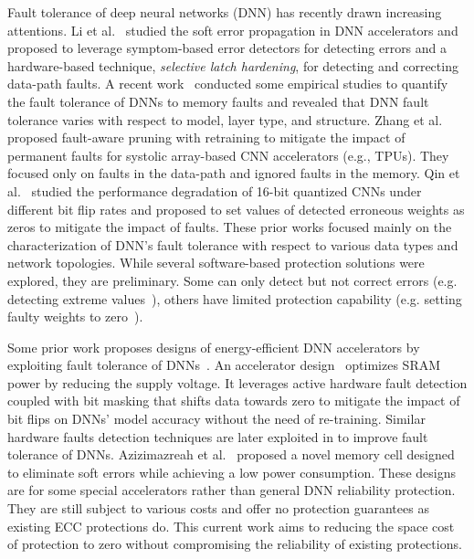 \documentclass{article}
\begin{document}
Fault tolerance of deep neural networks (DNN) has recently drawn increasing attentions. 
Li et al.~\cite{li2017understanding} studied the soft error propagation in DNN accelerators and proposed to leverage symptom-based error detectors for detecting errors and a hardware-based technique, {\em selective latch hardening},  for detecting and correcting data-path faults. A recent work~\cite{reagen2018ares, arechiga2018the} conducted some empirical studies to quantify the fault tolerance of DNNs to memory faults and revealed that DNN fault tolerance varies with respect to model, layer type, and structure. Zhang et al.~\cite{zhang2018analyzing} proposed fault-aware pruning with retraining to mitigate the impact of permanent faults for systolic array-based CNN accelerators (e.g., TPUs). They focused only on faults in the data-path and ignored faults in the memory.
Qin et al.~\cite{qin2017robustness} studied the performance degradation of 16-bit quantized CNNs under different bit flip rates and proposed to set values of detected erroneous weights as zeros to mitigate the impact of faults. 
These prior works focused mainly on the characterization of DNN's fault tolerance with respect to various data types and network topologies. While several software-based protection solutions were explored, they are preliminary. Some can only detect but not correct errors (e.g. detecting extreme values~\cite{li2017understanding}), others have limited protection capability (e.g. setting faulty weights to zero~\cite{qin2017robustness}).

Some prior work proposes designs of energy-efficient DNN accelerators by exploiting fault tolerance of DNNs~\cite{temam2012defect, kim2018energy, zhang2018thundervolt}. An accelerator design~\cite{reagen2016minerva} optimizes SRAM power by reducing the supply voltage. It leverages active hardware fault detection coupled with bit masking that shifts data towards zero to mitigate the impact of bit flips on DNNs' model accuracy without the need of re-training. 
Similar hardware faults detection techniques are later exploited in \cite{whatmough201714, salami2018resilience, zhang2018thundervolt, hacene2019training} to improve fault tolerance of DNNs. Azizimazreah et al.~\cite{azizimazreah2018tolerating} proposed a novel memory cell designed to eliminate soft errors while achieving a low power consumption.
These designs are for some special accelerators rather than general DNN reliability protection. They are still subject to various costs and offer no protection guarantees as existing ECC protections do. This current work aims to reducing the space cost of protection to zero without compromising the reliability of existing protections.
\end{document}
